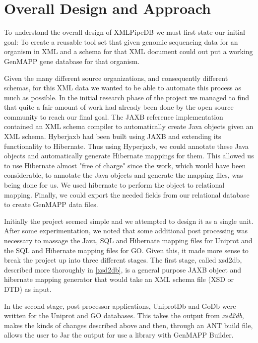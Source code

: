 \section{Overall Design and Approach}
\label{design}
To understand the overall design of XMLPipeDB we must first state our initial 
goal:  To create a reusable tool set that given genomic sequencing data for 
an organism in XML and a schema for that XML document could out put a working 
GenMAPP gene database for that organism.  

Given the many different source organizations, and consequently different schemas,  for this XML data we wanted to be able to automate this process as much as possible.  In the initial research phase of the project we managed to find that quite a fair amount of work had already been done by the open source community to reach our final goal.  The JAXB reference implementation contained an XML schema compiler to automatically create Java objects given an XML schema. Hyberjaxb had been built using JAXB and extending its functionality to Hibernate. Thus using Hyperjaxb, we could annotate these Java objects and automatically generate Hibernate mappings for them. This allowed us to use Hibernate almost "free of charge" since the work, which would have been considerable, to annotate the Java objects and generate the mapping files, was being done for us. We used hibernate to perform the object to relational mapping. Finally, we could export the needed fields from our relational database to create GenMAPP data files. 

Initially the project seemed simple and we attempted to design it as a single unit. After some experimentation, we noted that some additional post processing was necessary to massage the Java, SQL and Hibernate mapping files for Uniprot and the SQL and Hibernate mapping files for GO. Given this, it made more sense to break the project up into three different stages.  The first stage, called xsd2db, described more thoroughly in \ref{xsd2db}, is a general purpose JAXB object and hibernate mapping generator that would take an XML schema file (XSD or DTD) as input.   


In the second stage, post-processor applications, UniprotDb and GoDb were written for the Uniprot and GO databases. This takes the output from \emph{xsd2db}, makes the kinds of changes described above and then, through an ANT build file, allows the user to Jar the output for use a library with GenMAPP Builder.

